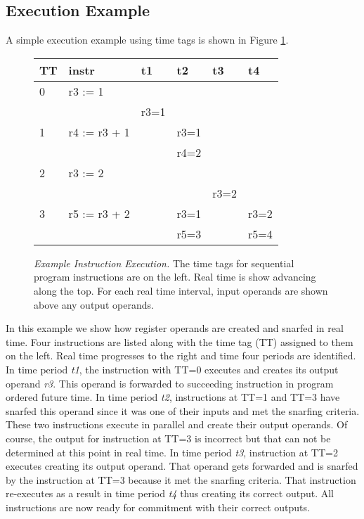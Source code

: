 \documentclass[10pt,dvips]{article}
\begin{document}
\subsection{Execution Example}
%
A simple execution example using time tags 
is shown in Figure \ref{fig:example1}.
%
\begin{figure}
\centering
\begin{tabular}{|l|l|l|l|l|l|}
\hline 
TT&instr&t1&t2&t3&t4\\
\hline 
0&r3 := 1&&&~~~~&\\
&&r3=1&&&\\
\hline 
1&r4 := r3 + 1&&r3=1&&~~~~\\
&&&r4=2&&\\
\hline 
2&r3 := 2&&&&~~~~\\
&&&&r3=2&\\
\hline 
3&r5 := r3 + 2&&r3=1&&r3=2\\
&&&r5=3&&r5=4\\
\hline 
\end{tabular}
\caption{{\em Example Instruction Execution.} The time tags for sequential
program instructions are on the left.  Real time is show advancing
along the top.  For each real time interval, input operands are shown
above any output operands.}
\label{fig:example1}
\end{figure}
%
In this example we show how register operands are created and
snarfed in real time.
Four instructions are listed along with the time tag (TT) assigned to them
on the left.  Real time progresses to the right and time four periods
are identified.  In time period \textit{t1}, the instruction with 
TT=0 executes and creates its output operand \textit{r3}.
This operand is forwarded to succeeding instruction in program
ordered future time.  In time period \textit{t2}, instructions
at TT=1 and TT=3 have snarfed this operand since it was one of
their inputs and met the snarfing criteria.  
These two instructions execute in parallel and
create their output operands.  Of course, the output for
instruction at TT=3 is incorrect but that can not be determined
at this point in real time.  In time period \textit{t3},
instruction at TT=2 executes creating its output operand.
That operand gets forwarded and is snarfed by the instruction at
TT=3 because it met the snarfing criteria.  That instruction
re-executes as a result in time period \textit{t4} thus
creating its correct output.  All instructions are now ready
for commitment with their correct outputs.
%
%
\end{document}
